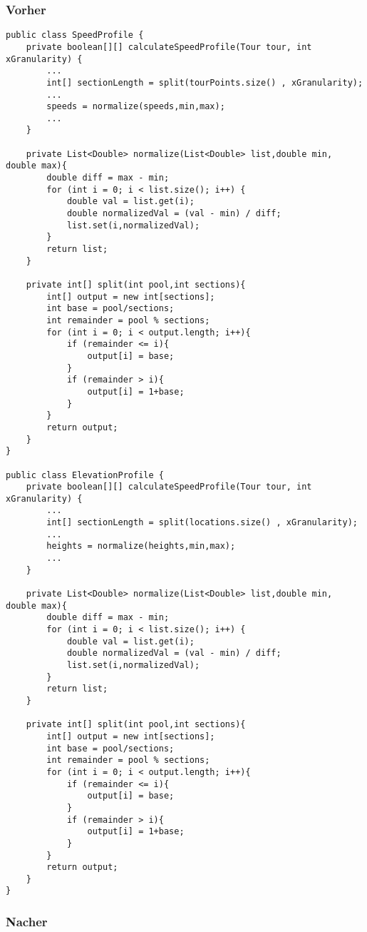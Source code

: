 \subsubsection{Vorher}

\begin{lstlisting}
public class SpeedProfile {
	private boolean[][] calculateSpeedProfile(Tour tour, int xGranularity) {
		...
		int[] sectionLength = split(tourPoints.size() , xGranularity);
		...
		speeds = normalize(speeds,min,max);
		...
	}

    private List<Double> normalize(List<Double> list,double min, double max){
        double diff = max - min;
        for (int i = 0; i < list.size(); i++) {
            double val = list.get(i);
            double normalizedVal = (val - min) / diff;
            list.set(i,normalizedVal);
        }
        return list;
    }

    private int[] split(int pool,int sections){
        int[] output = new int[sections];
        int base = pool/sections;
        int remainder = pool % sections;
        for (int i = 0; i < output.length; i++){
            if (remainder <= i){
                output[i] = base;
            }
            if (remainder > i){
                output[i] = 1+base;
            }
        }
        return output;
    }
}

public class ElevationProfile {
	private boolean[][] calculateSpeedProfile(Tour tour, int xGranularity) {
		...
		int[] sectionLength = split(locations.size() , xGranularity);
		...
		heights = normalize(heights,min,max);
		...
	}

    private List<Double> normalize(List<Double> list,double min, double max){
        double diff = max - min;
        for (int i = 0; i < list.size(); i++) {
            double val = list.get(i);
            double normalizedVal = (val - min) / diff;
            list.set(i,normalizedVal);
        }
        return list;
    }

    private int[] split(int pool,int sections){
        int[] output = new int[sections];
        int base = pool/sections;
        int remainder = pool % sections;
        for (int i = 0; i < output.length; i++){
            if (remainder <= i){
                output[i] = base;
            }
            if (remainder > i){
                output[i] = 1+base;
            }
        }
        return output;
    }
}

\end{lstlisting}


\subsubsection{Nacher}


